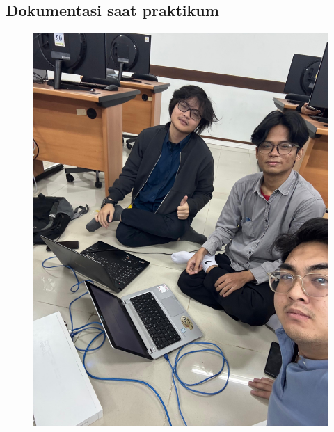 \subsection{Dokumentasi saat praktikum}
\begin{figure}[H]
    \centering
    \includegraphics[width=0.65\linewidth]{image/lampiran.jpg}
    \label{fig:inirujukan}
\end{figure}

